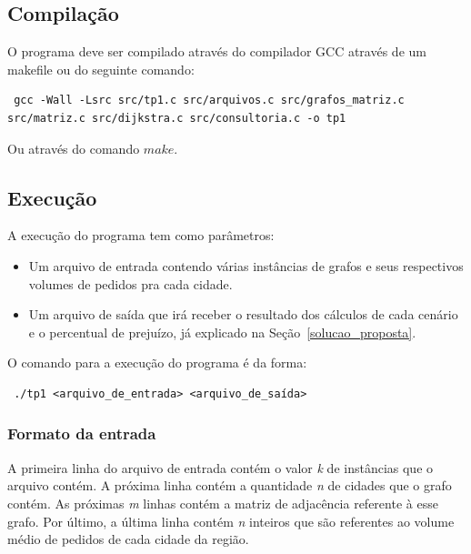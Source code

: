 \documentclass[12pt]{article}
\begin{document}
\subsection{Compilação}

O programa deve ser compilado através do compilador GCC através de um makefile ou do seguinte comando:

\begin{footnotesize}
\begin{verbatim} gcc -Wall -Lsrc src/tp1.c src/arquivos.c src/grafos_matriz.c src/matriz.c src/dijkstra.c src/consultoria.c -o tp1 \end{verbatim}
\end{footnotesize}

Ou através do comando $make$.

\subsection{Execução}

A execução do programa tem como parâmetros:
\begin{itemize}
\item Um arquivo de entrada contendo várias instâncias de grafos e seus respectivos volumes de pedidos pra cada cidade.
\item Um arquivo de saída que irá receber o resultado dos cálculos de cada cenário e o percentual de prejuízo, já explicado na Seção~\ref{solucao_proposta}.
\end{itemize}

O comando para a execução do programa é da forma:

\begin{footnotesize}
\begin{verbatim} ./tp1 <arquivo_de_entrada> <arquivo_de_saída>\end{verbatim}
\end{footnotesize}

\subsubsection{Formato da entrada}

A primeira linha do arquivo de entrada contém o valor \textit{k} de instâncias que o arquivo contém. A próxima linha contém a quantidade \textit{n} de cidades que o grafo contém. As próximas \textit{m} linhas contém a matriz de adjacência referente à esse grafo. Por último, a última linha contém \textit{n} inteiros que são referentes ao volume médio de pedidos de cada cidade da região.
\end{document}
